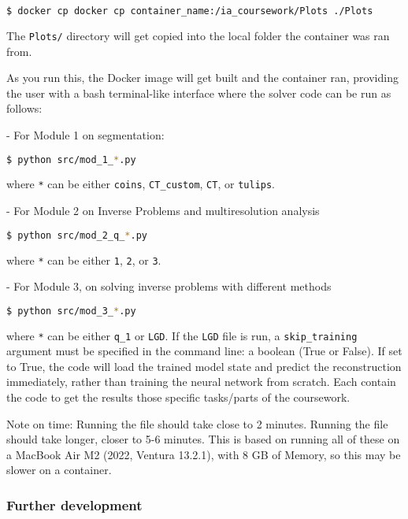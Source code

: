 \documentclass[12pt]{report} %
\begin{document}
\begin{lstlisting}[language=bash]
$ docker cp docker cp container_name:/ia_coursework/Plots ./Plots
\end{lstlisting}

The \texttt{Plots/} directory will get copied into the local folder the container was ran from.

As you run this, the Docker image will get built and the container ran, providing the user with a bash terminal-like interface where the solver code can be run as follows:

- For Module 1 on segmentation:
\begin{lstlisting}[language=bash]
$ python src/mod_1_*.py
\end{lstlisting}

where \texttt{*} can be either \texttt{coins}, \texttt{CT\_custom}, \texttt{CT}, or \texttt{tulips}.

- For Module 2 on Inverse Problems and multiresolution analysis
\begin{lstlisting}[language=bash]
$ python src/mod_2_q_*.py
\end{lstlisting}

where \texttt{*} can be either \texttt{1}, \texttt{2}, or \texttt{3}.

- For Module 3, on solving inverse problems with different methods
\begin{lstlisting}[language=bash]
$ python src/mod_3_*.py
\end{lstlisting}

where \texttt{*} can be either \texttt{q\_1} or \texttt{LGD}. If the \texttt{LGD} file is run, a \texttt{skip\_training} argument must be specified in the command line: a boolean (True or False). If set to True, the code will load the trained model state and predict the reconstruction immediately, rather than training the neural network from scratch. Each contain the code to get the results those specific tasks/parts of the coursework.

Note on time: Running the file should take close to 2 minutes. Running the file should take longer, closer to 5-6 minutes. This is based on running all of these on a MacBook Air M2 (2022, Ventura 13.2.1), with 8 GB of Memory, so this may be slower on a container.


\subsubsection{Further development}
\end{document}
